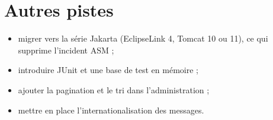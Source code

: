 \section{Autres pistes}
\begin{itemize}
  \item migrer vers la série Jakarta (EclipseLink 4, Tomcat 10 ou 11), ce qui supprime l'incident ASM ;
  \item introduire JUnit et une base de test en mémoire ;
  \item ajouter la pagination et le tri dans l'administration ;
  \item mettre en place l'internationalisation des messages.
\end{itemize}
